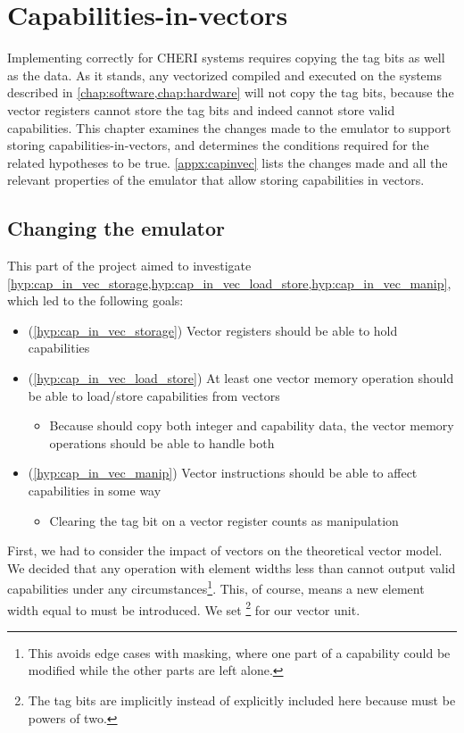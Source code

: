 \documentclass[../thesis]{subfiles}
\begin{document}
\chapter{Capabilities-in-vectors\label{chap:capinvec}}
Implementing  correctly for CHERI systems requires copying the tag bits as well as the data.
As it stands, any vectorized  compiled and executed on the systems described in \cref{chap:software,chap:hardware} will not copy the tag bits, because the vector registers cannot store the tag bits and indeed cannot store valid capabilities.
This chapter examines the changes made to the emulator to support storing capabilities-in-vectors, and determines the conditions required for the related hypotheses to be true.
\cref{appx:capinvec} lists the changes made and all the relevant properties of the emulator that allow storing capabilities in vectors.

\section{Changing the emulator}
This part of the project aimed to investigate \cref{hyp:cap_in_vec_storage,hyp:cap_in_vec_load_store,hyp:cap_in_vec_manip}, which led to the following goals:
\begin{itemize}
    \item (\cref{hyp:cap_in_vec_storage}) Vector registers should be able to hold capabilities 
    \item (\cref{hyp:cap_in_vec_load_store}) At least one vector memory operation should be able to load/store capabilities from vectors
    \begin{itemize}
        \item Because  should copy both integer and capability data, the vector memory operations should be able to handle both
    \end{itemize}
    \item (\cref{hyp:cap_in_vec_manip}) Vector instructions should be able to affect capabilities in some way
    \begin{itemize}
        \item Clearing the tag bit on a vector register counts as manipulation
    \end{itemize}
\end{itemize}

First, we had to consider the impact of vectors on the theoretical vector model.
We decided that any operation with element widths less than  cannot output valid capabilities under any circumstances\footnote{This avoids edge cases with masking, where one part of a capability could be modified while the other parts are left alone.}.
This, of course, means a new element width equal to  must be introduced.
We set \footnote{The tag bits are implicitly instead of explicitly included here because  must be powers of two.} for our vector unit.
\end{document}
